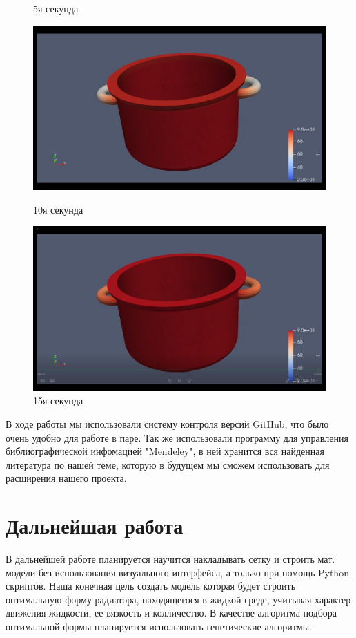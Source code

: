 \documentclass[a4paper,12pt]{article}
\theoremstyle{plain} %
\theoremstyle{definition} %
\theoremstyle{remark} %
\begin{document}
\begin{figure}[h]
\begin{center}
\begin{minipage}[h]{0.4\linewidth}
				\caption{5я секунда}
			\end{minipage}
			\begin{minipage}[h]{0.4\linewidth}
				\includegraphics[width=1\linewidth]{3s}
				\caption{10я секунда} %
			\end{minipage}
			\hfill
			\begin{minipage}[h]{0.4\linewidth}
				\includegraphics[width=1\linewidth]{4s}
				\caption{15я секунда}
			\end{minipage}
		\end{center}
	\end{figure}

В ходе работы мы использовали систему контроля версий GitHub, что было очень удобно для работе в паре. Так же использовали программу для управления библиографической инфомацией "Mendeley", в ней хранится вся найденная литература по нашей теме, которую в будущем мы сможем использовать для расширения нашего проекта.
\newpage

\section{Дальнейшая работа}
В дальнейшей работе  планируется научится накладывать сетку и строить мат. модели без использования визуального интерфейса, а только при помощь Python скриптов. Наша конечная цель создать модель которая будет строить оптимальную форму радиатора, находящегося в жидкой среде, учитывая характер движения жидкости, ее вязкость и колличество. В качестве алгоритма подбора оптимальной формы планируется использовать генетические алгоритмы.
\end{document}
